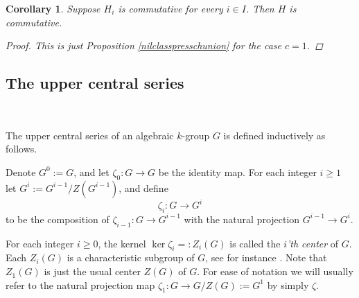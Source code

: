 \documentclass[twoside,a4paper,reqno,11pt]{amsart}
\newtheorem{corollary}[theorem]{Corollary}
\theoremstyle{definition}
\begin{document}
\begin{corollary}\label{commpresschunion} Suppose $H_i$ is commutative for every $i\in I$. Then $H$ is commutative.
\begin{proof} This is just Proposition \ref{nilclasspresschunion} for the case $c=1$.
\end{proof}
\end{corollary}



\subsection{The upper central series}\label{upcenser}\textcolor{white}{a}

\vspace{2mm}\noindent The upper central series of an algebraic $k$-group $G$ is defined inductively as follows. %

\vspace{2mm}\noindent Denote $G^0:=G$, and let $\zeta_0:G\to G$ be the identity map. For each integer $i\geq 1$ let $G^i:=G^{i-1}/Z(G^{i-1})$, and define \begin{equation}\label{zetai} \zeta_i:G\to G^i\end{equation} to be the composition of $\zeta_{i-1}:G\to G^{i-1}$ with the natural projection $G^{i-1}\to G^i$.

\vspace{2mm}\noindent For each integer $i\geq 0$, the kernel $\ker\zeta_i=:Z_i(G)$ is called the \textit{$i$'th center} of $G$. Each $Z_i(G)$ is a characteristic subgroup of $G$, see for instance \cite[IV, \S4, 1.3, Rem.\ 1.16]{DG}. Note that $Z_1(G)$ is just the usual center $Z(G)$ of $G$. For ease of notation we will usually refer to the natural projection map $\zeta_1:G\to G/Z(G):=G^1$ by simply $\zeta$.
\end{document}
